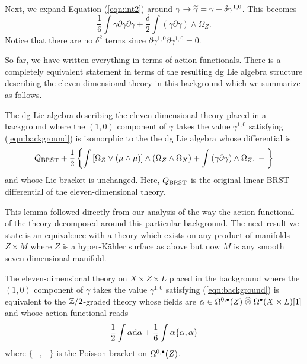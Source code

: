 \documentclass[11pt]{amsart}
\begin{document}
Next, we expand Equation (\ref{eqn:int2}) around $\gamma \to \Tilde{\gamma} = \gamma + \delta \gamma^{1,0}$.
This becomes
\[
  \frac16 \int \gamma \partial \gamma \partial \gamma + \frac{\delta}{2} \int \left(\gamma \partial \gamma\right) \wedge \Omega_Z .
\]
Notice that there are no $\delta^2$ terms since $\partial \gamma^{1,0} \partial \gamma^{1,0} = 0$.

So far, we have written everything in terms of action functionals.
There is a completely equivalent statement in terms of the resulting dg Lie algebra structure describing the eleven-dimensional theory in this background which we summarize as follows.

\begin{lem} \label{lem:background}
  The dg Lie algebra describing the eleven-dimensional theory placed in a background where the $(1,0)$ component of $\gamma$ takes the value $\gamma^{1,0}$ satisfying (\ref{eqn:background}) is isomorphic to the the dg Lie algebra whose differential is
  \begin{equation}\label{eqn:newdiff}
    Q_{\rm BRST} + \frac{1}{2} \left\{ \int \left[\Omega_Z \vee (\mu \wedge \mu) \right] \wedge (\Omega_Z \wedge \Omega_X) + \int \left(\gamma \partial \gamma\right) \wedge \Omega_Z , \; - \; \right\}
  \end{equation}
  and whose Lie bracket is unchanged.
  Here, $Q_{\rm BRST}$ is the original linear BRST differential of the eleven-dimensional theory.
\end{lem}

This lemma followed directly from our analysis of the way the action functional of the theory decomposed around this particular background.
The next result we state is an equivalence with a theory which exists on any product of manifolds $Z \times M$ where $Z$ is a hyper-K\"{a}hler surface as above but now $M$ is any smooth seven-dimensional manifold.

\begin{prop}
  The eleven-dimensional theory on $X \times Z \times L$ placed in the background where the $(1,0)$ component of $\gamma$ takes the value $\gamma^{1,0}$ satisfying (\ref{eqn:background}) is equivalent to the $\ZZ/2$-graded theory whose fields are
    $\alpha \in \Omega^{0,\bu}(Z) \; \Hat{\otimes} \; \Omega^\bu(X \times L) [1]$
  and whose action functional reads
  \[
    \frac12 \int \alpha \d\alpha + \frac16 \int \alpha \{\alpha, \alpha\}
  \]
  where $\{-,-\}$ is the Poisson bracket on $\Omega^{0,\bu}(Z)$.
\end{prop}
\end{document}
